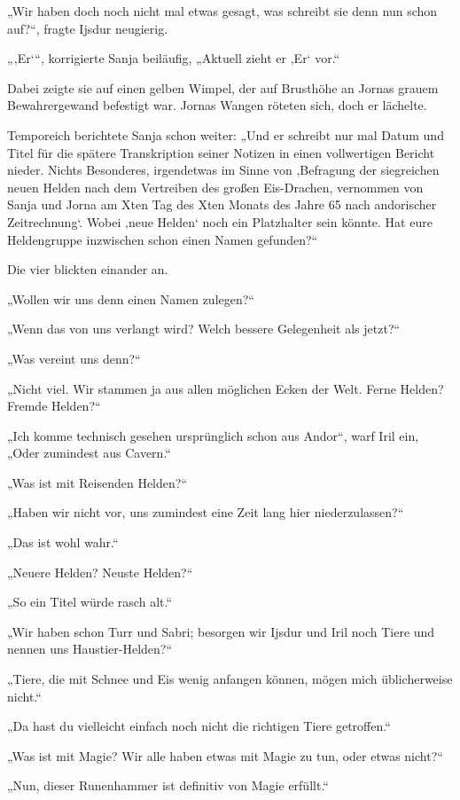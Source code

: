 „Wir haben doch noch nicht mal etwas gesagt, was schreibt sie denn nun schon auf?“, fragte Ijsdur neugierig.

„‚Er‘“, korrigierte Sanja beiläufig, „Aktuell zieht er ‚Er‘ vor.“

Dabei zeigte sie auf einen gelben Wimpel, der auf Brusthöhe an Jornas grauem Bewahrergewand befestigt war. Jornas Wangen röteten sich, doch er lächelte.

Temporeich berichtete Sanja schon weiter: „Und er schreibt nur mal Datum und Titel für die spätere Transkription seiner Notizen in einen vollwertigen Bericht nieder. Nichts Besonderes, irgendetwas im Sinne von ‚Befragung der siegreichen neuen Helden nach dem Vertreiben des großen Eis-Drachen, vernommen von Sanja und Jorna am Xten Tag des Xten Monats des Jahre 65 nach andorischer Zeitrechnung‘. Wobei ‚neue Helden‘ noch ein Platzhalter sein könnte. Hat eure Heldengruppe inzwischen schon einen Namen gefunden?“

Die vier blickten einander an.

„Wollen wir uns denn einen Namen zulegen?“

„Wenn das von uns verlangt wird? Welch bessere Gelegenheit als jetzt?“

„Was vereint uns denn?“

„Nicht viel. Wir stammen ja aus allen möglichen Ecken der Welt. Ferne Helden? Fremde Helden?“

„Ich komme technisch gesehen ursprünglich schon aus Andor“, warf Iril ein, „Oder zumindest aus Cavern.“

„Was ist mit Reisenden Helden?“

„Haben wir nicht vor, uns zumindest eine Zeit lang hier niederzulassen?“

„Das ist wohl wahr.“

„Neuere Helden? Neuste Helden?“

„So ein Titel würde rasch alt.“

„Wir haben schon Turr und Sabri; besorgen wir Ijsdur und Iril noch Tiere und nennen uns Haustier-Helden?“

„Tiere, die mit Schnee und Eis wenig anfangen können, mögen mich üblicherweise nicht.“

„Da hast du vielleicht einfach noch nicht die richtigen Tiere getroffen.“

„Was ist mit Magie? Wir alle haben etwas mit Magie zu tun, oder etwas nicht?“

„Nun, dieser Runenhammer ist definitiv von Magie erfüllt.“

